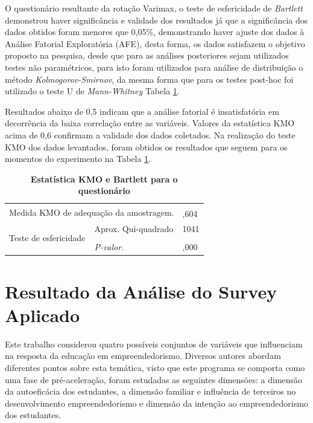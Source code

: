 O questionário resultante da rotação Varimax, o teste de esfericidade de \textit{Bartlett} demonstrou haver significância e validade dos resultados já que a significância dos dados obtidos foram menores que 0,05\%, demonstrando haver ajuste dos dados à Análise Fatorial Exploratória (AFE), desta forma, os dados satisfazem o objetivo proposto na pesquisa, desde que para as análises posteriores sejam utilizados testes não paramétricos, para isto foram utilizados para análise de distribuição o método \textit{Kolmogorov-Smirnov}, da mesma forma que para os testes post-hoc foi utilizado o teste U de \textit{Mann-Whitney} Tabela \ref{tabela_8}.

Resultados abaixo de 0,5 indicam que a análise fatorial é insatisfatória em decorrência da baixa correlação entre as variáveis. Valores da estatística KMO acima de 0,6 confirmam a validade dos dados coletados. Na realização do teste KMO dos dados levantados, foram obtidos os resultados que seguem para os momentos do experimento na Tabela \ref{tabela_8}.

\begin{table}[H]
\FloatBarrier
\centering
\caption{\textbf{Estatística KMO e Bartlett para o questionário}}
\label{tabela_8}
\begin{tabular}{ll|l}
\hline\hline
\multicolumn{2}{l|}{\multirow{2}{*}{Medida KMO de adequação da amostragem.}} &  \\
\multicolumn{2}{l|}{} & ,604 \\ \hline
\multirow{3}{*}{Teste de esfericidade} & Aprox. Qui-quadrado & 1041 \\
 & \\
 & \textit{P-valor}. & ,000 \\ \hline
\end{tabular}
\end{table}

\section{Resultado da Análise do Survey Aplicado}

Este trabalho considerou quatro possíveis conjuntos de variáveis que influenciam na resposta da educação em empreendedorismo. Diversos autores abordam diferentes pontos sobre esta temática, visto que este programa se comporta como uma fase de pré-aceleração, foram estudadas as seguintes dimensões: a dimensão da autoeficácia dos estudantes,  a dimensão familiar e influência de terceiros no desenvolvimento empreendedorismo e dimensão da intenção  ao empreendedorismo dos estudantes.


